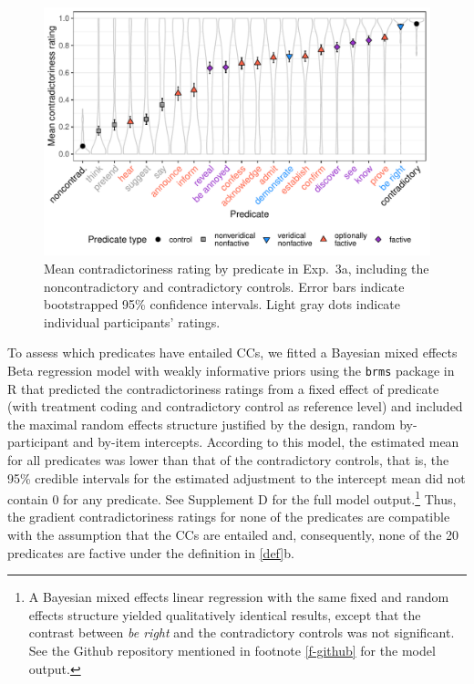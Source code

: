 \documentclass{language}
\newcommand{\6}{\mbox{$[\hspace*{-.6mm}[$}}
\newcommand{\9}{\mbox{$]\hspace*{-.6mm}]$}}
\begin{document}
\begin{figure}[h!]
\centering

\includegraphics[width=.7\paperwidth]{Language-figures/color/Figure13}

\caption{Mean contradictoriness rating by predicate in Exp.~3a, including the noncontradictory and contradictory controls. Error bars indicate bootstrapped 95\% confidence intervals. Light gray dots indicate individual participants' ratings.}
\label{f-veridicality-predicate2}
\end{figure}

To assess which predicates have entailed CCs, we fitted a Bayesian mixed effects Beta regression model  with weakly informative priors using the \verb|brms|  package in R that predicted the contradictoriness ratings from a fixed effect of predicate (with treatment coding and contradictory control as  reference level) and included the maximal random effects structure justified by the design, random by-participant and by-item intercepts. According to this model, the estimated mean for all predicates was lower than that of the contradictory controls, that is, the 95\% credible intervals for the estimated adjustment to the intercept mean did not contain 0 for any predicate. See Supplement D for the full model output.\footnote{A Bayesian mixed effects linear regression with the same fixed and random effects structure yielded qualitatively identical results, except that the contrast between \emph{be right} and the contradictory controls was not significant. See the Github repository mentioned in footnote \ref{f-github} for the model output.} Thus, the gradient contradictoriness ratings for none of the predicates are compatible with the assumption that the CCs are entailed and, consequently, none of the 20 predicates are factive under the definition in \ref{def}b. 
\end{document}

